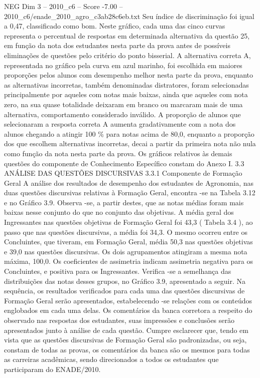 \begin{textsample}{NEG Dim 3 – 2010\_c6 – Score -7.00 – 2010\_c6/enade\_2010\_agro\_c3ab28c6eb.txt}
Seu índice de discriminação foi igual a 0,47, classificado como bom.
Neste gráfico, cada uma das cinco curvas representa o percentual de respostas em determinada alternativa da questão 25, em função da nota dos estudantes nesta parte da prova antes de possíveis eliminações de questões pelo critério do ponto bisserial.
A alternativa correta A, representada no gráfico pela curva em azul marinho, foi escolhida em maiores proporções pelos alunos com desempenho melhor nesta parte da prova, enquanto as alternativas incorretas, também denominadas distratores, foram selecionadas principalmente por aqueles com notas mais baixas, ainda que aqueles com nota zero, na sua quase totalidade deixaram em branco ou marcaram mais de uma alternativa, comportamento considerado inválido.
A proporção de alunos que selecionaram a resposta correta A aumenta gradativamente com a nota dos alunos chegando a atingir 100 \% para notas acima de 80,0, enquanto a proporção dos que escolhem alternativas incorretas, decai a partir da primeira nota não nula como função da nota nesta parte da prova.
Os gráficos relativos às demais questões do componente de Conhecimento Específico constam do Anexo I. 3.3 ANÁLISE DAS QUESTÕES DISCURSIVAS 3.3.1 Componente de Formação Geral A análise dos resultados de desempenho dos estudantes de Agronomia, nas duas questões discursivas relativas à Formação Geral, encontra -se na Tabela 3.12 e no Gráfico 3.9.
Observa -se, a partir destes, que as notas médias foram mais baixas nesse conjunto do que no conjunto das objetivas.
A média geral dos Ingressantes nas questões objetivas de Formação Geral foi 43,3 ( Tabela 3.4 ), ao passo que nas questões discursivas, a média foi 34,3.
O mesmo ocorreu entre os Concluintes, que tiveram, em Formação Geral, média 50,3 nas questões objetivas e 39,0 nas questões discursivas.
Os dois agrupamentos atingiram a mesma nota máxima, 100,0.
Os coeficientes de assimetria indicam assimetria negativa para os Concluintes, e positiva para os Ingressantes.
Verifica -se a semelhança das distribuições das notas desses grupos, no Gráfico 3.9, apresentado a seguir.
Na sequência, os resultados verificados para cada uma das questões discursivas de Formação Geral serão apresentados, estabelecendo -se relações com os conteúdos englobados em cada uma delas.
Os comentários da banca corretora a respeito do observado nas respostas dos estudantes, suas impressões e conclusões serão apresentados junto à análise de cada questão.
Cumpre esclarecer que, tendo em vista que as questões discursivas de Formação Geral são padronizadas, ou seja, constam de todas as provas, os comentários da banca são os mesmos para todas as carreiras acadêmicas, sendo direcionados a todos os estudantes que participaram do ENADE/2010.

\end{textsample}
